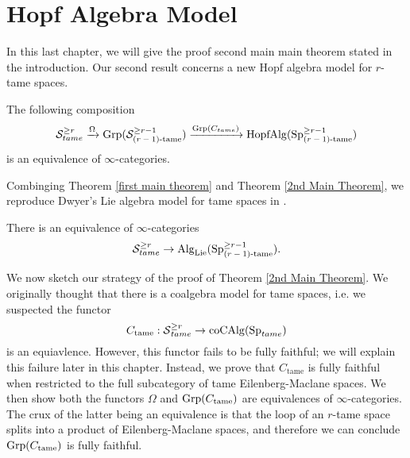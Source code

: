\chapter{Hopf Algebra Model}

In this last chapter, we will give the proof second main main theorem stated in the introduction.
Our second result concerns a new Hopf algebra model for $r$-tame spaces. 
\begin{theorem}
\label{2nd Main Theorem}
The following composition 
$$
{\mathcal{S}}^{\geq r}_{tame} \xrightarrow{\Omega}
\operatorname{Grp}({\mathcal{S}}^{\geq r-1}_{\text{($r-1$)-tame}})
\xrightarrow{\operatorname{Grp}(C_{tame})}
\operatorname{HopfAlg}(\operatorname{Sp}^{\geq r-1}_{\text{($r-1$)-tame}})
$$
is an equivalence of $\infty$-categories.
\end{theorem}
Combinging Theorem \ref{first main theorem} and Theorem \ref{2nd Main Theorem}, we reproduce Dwyer's Lie algebra model for tame spaces in \cite{Dwyer}.
\begin{theorem}
\cite{Dwyer}
	There is an equivalence of $\infty$-categories
	\[
	{\mathcal{S}}^{\geq r}_{tame} 
	\to
	\operatorname{Alg}_{\operatorname{Lie}}(\operatorname{Sp}^{\geq r-1}_{\text{($r-1$)-tame}}).
	\]
\end{theorem}

We now sketch our strategy of the proof of Theorem \ref{2nd Main Theorem}.
We originally thought that there is a coalgebra model for tame spaces, i.e. we suspected the functor
	$$
	C_{\operatorname{tame}}:\operatorname{\mathcal{S}}^{\geq r}_{tame}\to \operatorname{coCAlg}(\operatorname{Sp}_{tame})
	$$
	is an equiavlence. However, this functor fails to be fully faithful; we will explain this failure later in this chapter.
	Instead, we prove that $C_{\operatorname{tame}}$ is fully faithful when restricted to the full subcategory of tame Eilenberg-Maclane spaces.
We then show both the functors $\Omega$ and $\operatorname{Grp}(C_{\operatorname{tame}})$ are equivalences of $\infty$-categories. 
The crux of the latter being an equivalence is that the loop of an $r$-tame space splits into a product of Eilenberg-Maclane spaces, and therefore we can conclude $\operatorname{Grp}(C_{\operatorname{tame}})$ is fully faithful.


